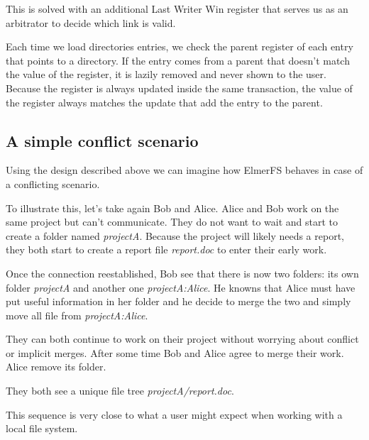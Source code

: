 \documentclass[sigconf,anonymous,10pt]{acmart}
\begin{document}
This is solved with an additional Last Writer Win register that serves us as
an arbitrator to decide which link is valid.

Each time we load directories  entries, we check the parent register of each
entry that points to a directory. If the entry comes from a parent that doesn’t
match the value of the register, it is lazily removed and never shown to the user.
Because the register is always updated inside the same transaction, the
value of the register always matches the update that add the entry
to the parent.

\subsection{A simple conflict scenario}

Using the design described above we can imagine how ElmerFS behaves in case
of a conflicting scenario.

To illustrate this, let's take again Bob and Alice. Alice and Bob work
on the same project but can't communicate. They do not want to wait and start to create a
folder named \textit{projectA}. Because the project will likely needs a report,
they both start to create a report file \textit{report.doc} to enter their early work.

Once the connection reestablished, Bob see that there is now two folders:
its own folder \textit{projectA} and another one \textit{projectA:Alice}.
He knowns that Alice must have put useful information in her folder and he
decide to merge the two and simply move all file from \textit{projectA:Alice}.

They can both continue to work on their project without worrying about
conflict or implicit merges. After some time Bob and Alice agree to merge
their work. Alice remove its folder.

They both see a unique file tree \textit{projectA/report.doc}.

This sequence is very close to what a user might expect when working with
a local file system.
\end{document}
